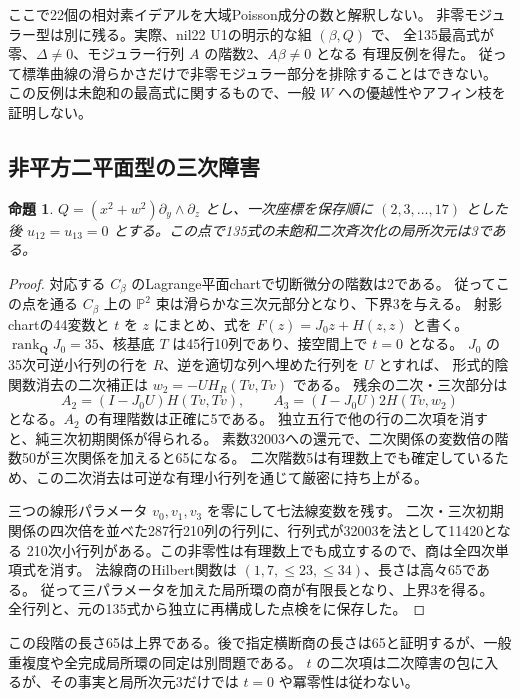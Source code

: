 \documentclass[11pt,a4paper]{ltjsarticle}
\newcommand{\QQ}{\mathbf Q}
\newtheorem{proposition}[theorem]{命題}
\theoremstyle{remark}
\begin{document}
ここで22個の相対素イデアルを大域Poisson成分の数と解釈しない。
非零モジュラー型は別に残る。実際、nil22 U1の明示的な組 $(\beta,Q)$ で、
全135最高式が零、$\Delta\ne0$、モジュラー行列 $A$ の階数2、$A\beta\ne0$ となる
有理反例を得た\cite{modular-counterexample-v33}。
従って標準曲線の滑らかさだけで非零モジュラー部分を排除することはできない。
この反例は未飽和の最高式に関するもので、一般 $W$ への優越性やアフィン枝を証明しない。

\subsection{非平方二平面型の三次障害}
\begin{proposition}\label{prop:binary-local-v33}
$Q=(x^2+w^2)\partial_y\wedge\partial_z$ とし、一次座標を保存順に $(2,3,\ldots,17)$ とした後
$u_{12}=u_{13}=0$ とする。この点で135式の未飽和二次斉次化の局所次元は3である。
\end{proposition}
\begin{proof}
対応する $C_\beta$ のLagrange平面chartで切断微分の階数は2である。
従ってこの点を通る $C_\beta$ 上の $\mathbb P^2$ 束は滑らかな三次元部分となり、下界3を与える。
射影chartの44変数と $t$ を $z$ にまとめ、式を $F(z)=J_0z+H(z,z)$ と書く。
$\operatorname{rank}_{\QQ}J_0=35$、核基底 $T$ は45行10列であり、接空間上で $t=0$ となる。
$J_0$ の35次可逆小行列の行を $R$、逆を適切な列へ埋めた行列を $U$ とすれば、
形式的陰関数消去の二次補正は $w_2=-UH_R(Tv,Tv)$ である。
残余の二次・三次部分は
\[
 A_2=(I-J_0U)H(Tv,Tv),\qquad
 A_3=(I-J_0U)2H(Tv,w_2)
\]
となる。$A_2$ の有理階数は正確に5である。
独立五行で他の行の二次項を消すと、純三次初期関係が得られる。
素数32003への還元で、二次関係の変数倍の階数50が三次関係を加えると65になる。
二次階数5は有理数上でも確定しているため、この二次消去は可逆な有理小行列を通じて厳密に持ち上がる。

三つの線形パラメータ $v_0,v_1,v_3$ を零にして七法線変数を残す。
二次・三次初期関係の四次倍を並べた287行210列の行列に、行列式が32003を法として11420となる
210次小行列がある。この非零性は有理数上でも成立するので、商は全四次単項式を消す。
法線商のHilbert関数は $(1,7,\le23,\le34)$、長さは高々65である。
従って三パラメータを加えた局所環の商が有限長となり、上界3を得る。
全行列と、元の135式から独立に再構成した点検を\cite{binary-local-v33}に保存した。
\end{proof}

この段階の長さ65は上界である。後で指定横断商の長さは65と証明するが、一般重複度や全完成局所環の同定は別問題である。
$t$ の二次項は二次障害の包に入るが、その事実と局所次元3だけでは $t=0$ や冪零性は従わない。
\end{document}
